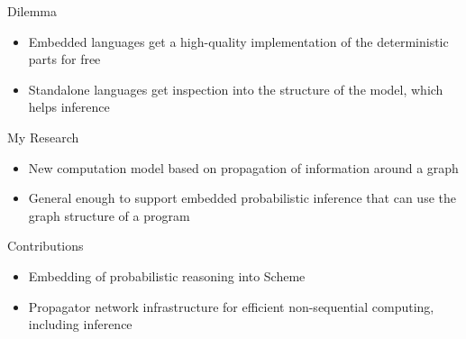 \documentclass{beamer}
\begin{document}
\begin{frame}
\begin{center}\Huge Dilemma\end{center}
\begin{itemize}
\item Embedded languages get a high-quality implementation of the
  deterministic parts for free %
\item Standalone languages get inspection into the structure of the
  model, which helps inference %
\end{itemize}
\end{frame}

\begin{frame}
\begin{center}\Huge My Research\end{center}
\begin{itemize}
\item New computation model based on propagation of information around a graph
\item General enough to support embedded probabilistic inference that
  can use the graph structure of a program
\end{itemize}
\end{frame}

\begin{frame}
\begin{center}\Huge Contributions\end{center}
\begin{itemize}
\item Embedding of probabilistic reasoning into Scheme
\item Propagator network infrastructure for efficient non-sequential
  computing, including inference
\end{itemize}
\end{frame}
\end{document}
